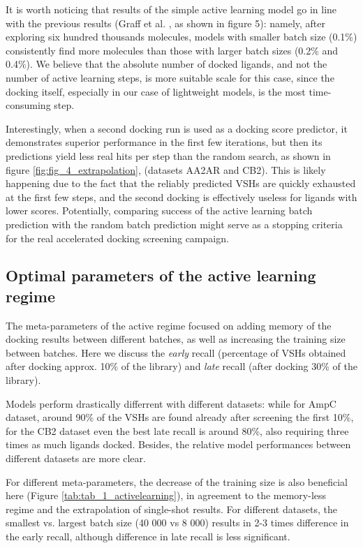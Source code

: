 It is worth noticing that results of the simple active learning model go in line with the previous results (Graff et al. \cite{Graff2021AcceleratingLearning}, as shown in figure 5): namely, after exploring six hundred thousands molecules, models with smaller batch size (0.1\%) consistently find more molecules than those with larger batch sizes (0.2\% and 0.4\%). We believe that the absolute number of docked ligands, and not the number of active learning steps, is more suitable scale for this case, since the docking itself, especially in our case of lightweight models, is the most time-consuming step.

Interestingly, when a second docking run is used as a docking score predictor, it demonstrates superior performance in the first few iterations, but then its predictions yield less real hits per step than the random search, as shown in figure \ref{fig:fig_4_extrapolation}, (datasets AA2AR and CB2). This is likely happening due to the fact that the reliably predicted VSHs are quickly exhausted at the first few steps, and the second docking is effectively useless for ligands with lower scores. Potentially, comparing success of the active learning batch prediction with the random batch prediction might serve as a stopping criteria for the real accelerated docking screening campaign.

\subsection{Optimal parameters of the active learning regime}
The meta-parameters of the active regime focused on adding memory of the docking results between different batches, as well as increasing the training size between batches. Here we discuss the \textit{early} recall (percentage of VSHs obtained after docking approx. 10\% of the library) and \textit{late} recall (after docking 30\% of the library).

Models perform drastically differrent with different datasets: while for AmpC dataset, around 90\% of the VSHs are found already after screening the first 10\%, for the CB2 dataset even the best late recall is around 80\%, also requiring three times as much ligands docked. Besides, the relative model performances between different datasets are more clear.

For different meta-parameters, the decrease of the training size is also beneficial here (Figure \ref{tab:tab_1_activelearning}), in agreement to the memory-less regime and the extrapolation of single-shot results. For different datasets, the smallest vs. largest batch size (40 000 vs 8 000) results in 2-3 times difference in the early recall, although difference in late recall is less significant.

